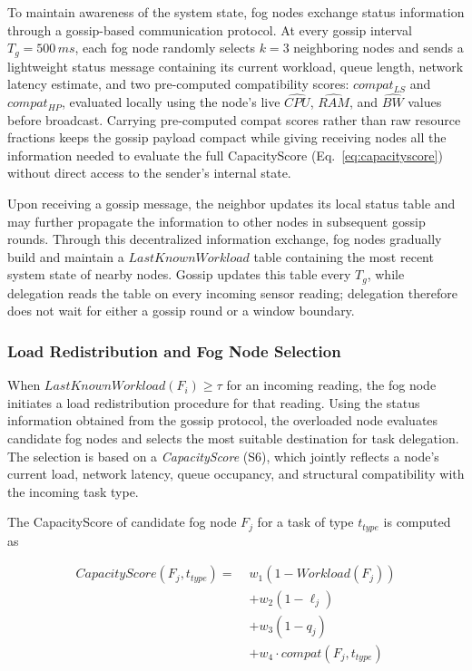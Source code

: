 \documentclass[conference]{IEEEtran}
\begin{document}
    To maintain awareness of the system state, fog nodes exchange status information through a gossip-based communication protocol. At every gossip interval $T_g=500\,ms$, each fog node randomly selects $k=3$ neighboring nodes and sends a lightweight status message containing its current workload, queue length, network latency estimate, and two pre-computed compatibility scores: $compat_{LS}$ and $compat_{HP}$, evaluated locally using the node's live $\widehat{CPU}$, $\widehat{RAM}$, and $\widehat{BW}$ values before broadcast. Carrying pre-computed compat scores rather than raw resource fractions keeps the gossip payload compact while giving receiving nodes all the information needed to evaluate the full CapacityScore (Eq.~\eqref{eq:capacityscore}) without direct access to the sender's internal state.

    Upon receiving a gossip message, the neighbor updates its local status table and may further propagate the information to other nodes in subsequent gossip rounds. Through this decentralized information exchange, fog nodes gradually build and maintain a $LastKnownWorkload$ table containing the most recent system state of nearby nodes. Gossip updates this table every $T_g$, while delegation reads the table on every incoming sensor reading; delegation therefore does not wait for either a gossip round or a window boundary.

    \subsubsection{Load Redistribution and Fog Node Selection}

    When $LastKnownWorkload(F_i)\geq\tau$ for an incoming reading, the fog node initiates a load redistribution procedure for that reading. Using the status information obtained from the gossip protocol, the overloaded node evaluates candidate fog nodes and selects the most suitable destination for task delegation. The selection is based on a \textit{CapacityScore} (S6), which jointly reflects a node's current load, network latency, queue occupancy, and structural compatibility with the incoming task type.

    The CapacityScore of candidate fog node $F_j$ for a task of type $t_{type}$ is computed as

    \begin{equation}
    \begin{aligned}
    CapacityScore(F_j,t_{type}) =\;& w_1(1-Workload(F_j)) \\
    &+ w_2(1-\ell_j) \\
    &+ w_3(1-q_j) \\
    &+ w_4\cdot compat(F_j,t_{type})
    \end{aligned}
    \label{eq:capacityscore}
    \end{equation}
\end{document}
